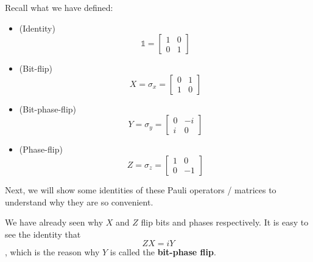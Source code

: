 \documentclass[12pt]{article}
\begin{document}
\begin{recall}
Recall what we have defined:
\begin{itemize}
    \item (Identity) $$
    \mathbb{1} = \begin{bmatrix}
        1 & 0\\
        0 & 1
    \end{bmatrix}
    $$
    \item (Bit-flip) $$
    X = \sigma_x = \begin{bmatrix}
        0 & 1\\
        1 & 0
    \end{bmatrix}
    $$
    \item (Bit-phase-flip) $$
    Y = \sigma_y = \begin{bmatrix}
        0 & -i\\
        i & 0
    \end{bmatrix}
    $$
    \item (Phase-flip) $$
    Z = \sigma_z = \begin{bmatrix}
        1 & 0\\
        0 & -1
    \end{bmatrix}
    $$
\end{itemize}
Next, we will show some identities of these Pauli operators / matrices to understand why they are so convenient.
\end{recall}

\begin{proposition}
We have already seen why $X$ and $Z$ flip bits and phases respectively. It is easy to see the identity that $$
ZX = iY
$$, which is the reason why $Y$ is called the \textbf{bit-phase flip}.
\end{proposition}
\end{document}
